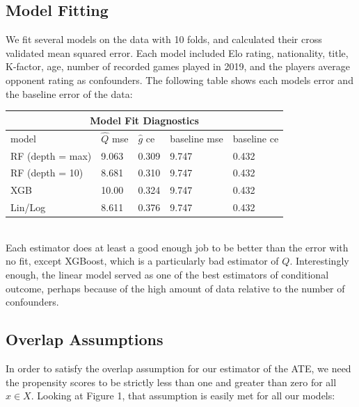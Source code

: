 \documentclass[letterpaper, 11pt]{article}
\begin{document}
    \subsection*{Model Fitting}
        We fit several models on the data with 10 folds, and calculated their cross validated mean squared error. 
        Each model included Elo rating, nationality, title, K-factor, age, number of recorded games played in 2019, and the players average opponent rating as confounders.
        The following table shows each models error and the baseline error of the data: \\

        \begin{tabular}{ |p{4cm}||p{2cm}|p{2cm}|p{3cm}|p{3cm}| }
            \hline
            \multicolumn{5}{|c|}{Model Fit Diagnostics} \\
            \hline
            model & $\hat{Q}$ mse & $\hat{g}$ ce & baseline mse & baseline ce\\
            \hline
            RF (depth = max) & 9.063 & 0.309 & 9.747 & 0.432 \\
            RF (depth = 10)  & 8.681 & 0.310 & 9.747 & 0.432 \\
            XGB              & 10.00 & 0.324 & 9.747 & 0.432 \\
            Lin/Log          & 8.611 & 0.376 & 9.747 & 0.432 \\
            \hline
        \end{tabular} \\

        Each estimator does at least a good enough job to be better than the error with no fit, except XGBoost, which is a particularly bad estimator of $Q$.
        Interestingly enough, the linear model served as one of the best estimators of conditional outcome, perhaps because of the high amount of data relative to the number of confounders.

    \subsection*{Overlap Assumptions}

        In order to satisfy the overlap assumption for our estimator of the ATE, we need the propensity scores to be strictly less than one and greater than zero for all $x \in X$. 
        Looking at Figure 1, that assumption is easily met for all our models:
\end{document}
